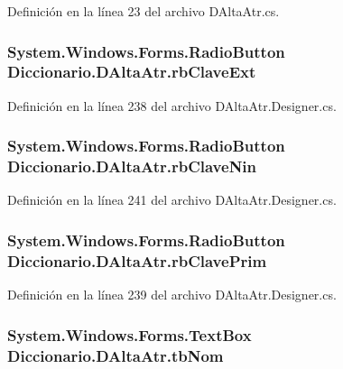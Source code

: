 Definición en la línea 23 del archivo D\-Alta\-Atr.\-cs.

\hypertarget{class_diccionario_1_1_d_alta_atr_a2395d4ed5ce6f1b87c44c9e426f113f7}{
\subsubsection[{rb\-Clave\-Ext}]{\setlength{\rightskip}{0pt plus 5cm}System.\-Windows.\-Forms.\-Radio\-Button Diccionario.\-D\-Alta\-Atr.\-rb\-Clave\-Ext}}\label{class_diccionario_1_1_d_alta_atr_a2395d4ed5ce6f1b87c44c9e426f113f7}


Definición en la línea 238 del archivo D\-Alta\-Atr.\-Designer.\-cs.

\hypertarget{class_diccionario_1_1_d_alta_atr_a9e79897c007af92baf3505b80375ae5b}{
\subsubsection[{rb\-Clave\-Nin}]{\setlength{\rightskip}{0pt plus 5cm}System.\-Windows.\-Forms.\-Radio\-Button Diccionario.\-D\-Alta\-Atr.\-rb\-Clave\-Nin}}\label{class_diccionario_1_1_d_alta_atr_a9e79897c007af92baf3505b80375ae5b}


Definición en la línea 241 del archivo D\-Alta\-Atr.\-Designer.\-cs.

\hypertarget{class_diccionario_1_1_d_alta_atr_a3244afafac8517fc34a939e2292e56d4}{
\subsubsection[{rb\-Clave\-Prim}]{\setlength{\rightskip}{0pt plus 5cm}System.\-Windows.\-Forms.\-Radio\-Button Diccionario.\-D\-Alta\-Atr.\-rb\-Clave\-Prim}}\label{class_diccionario_1_1_d_alta_atr_a3244afafac8517fc34a939e2292e56d4}


Definición en la línea 239 del archivo D\-Alta\-Atr.\-Designer.\-cs.

\hypertarget{class_diccionario_1_1_d_alta_atr_af7808ef47c9c529c6599866647e7cb2b}{
\subsubsection[{tb\-Nom}]{\setlength{\rightskip}{0pt plus 5cm}System.\-Windows.\-Forms.\-Text\-Box Diccionario.\-D\-Alta\-Atr.\-tb\-Nom}}\label{class_diccionario_1_1_d_alta_atr_af7808ef47c9c529c6599866647e7cb2b}


